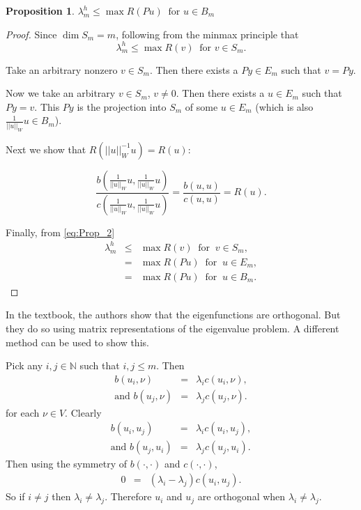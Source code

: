 \documentclass[../../main.tex]{subfiles}
\begin{document}
\newtheorem{Prop_2}[Prop_1]{Proposition}
\begin{Prop_2}
	\label{Prop_2}
	$\lambda^{h}_{m} \leq \max R(Pu) \ \text{ for } u \in B_{m}$
\end{Prop_2}
\begin{proof}
	Since $\dim S_{m} = m$, following from the minmax principle that
	\begin{equation}
		\lambda_m^h \leq \max R(v) \ \text{ for } v \in S_m. \label{eq:Prop_2}
	\end{equation}

	Take an arbitrary nonzero $v \in S_m$. Then there exists a $Py \in E_m$ such that $v = Py$.
 
	Now we take an arbitrary $v \in S_{m}$, $v \neq 0$. Then there exists a $u \in E_{m}$ such that $Py = v$. This $Py$ is the projection into $S_m$ of some $u \in E_m$ (which is also $\displaystyle \frac{1}{||u||_{W}}u \in B_m$).
	
	Next we show that $R(||u||_{W}^{-1}u) = R(u)$:

	\[ \frac{b\left(\frac{1}{||u||_{W}}u,\frac{1}{||u||_{W}}u\right)}{c\left(\frac{1}{||u||_{W}}u,\frac{1}{||u||_{W}}u\right)} = \frac{b(u,u)}{c(u,u)} = R(u). \]

	Finally, from \eqref{eq:Prop_2}
	\begin{eqnarray*}
	\lambda_{m}^{h} &\leq & \max R(v) \ \text{ for } \ v \in S_{m},\\
						&=& \max R(Pu) \ \text{ for } \ u \in E_{m},\\
						&=& \max R(Pu) \ \text{ for } \ u \in B_{m}.
	\end{eqnarray*}
\end{proof}

In the textbook, the authors show that the eigenfunctions are orthogonal. But they do so using matrix representations of the eigenvalue problem. A different method can be used to show this.

Pick any $i,j \in \mathbb{N}$ such that $i,j \leq m$. Then
\begin{eqnarray*}
	b(u_{i},\nu) &=& \lambda_{i}c(u_{i},\nu),\\
	\textrm{and } b(u_{j},\nu) &=& \lambda_{j}c(u_{j},\nu).
\end{eqnarray*}
for each $\nu \in V$. Clearly
\begin{eqnarray*}
	b(u_{i},u_{j}) &=& \lambda_{i}c(u_{i},u_{j}),\\
	\textrm{and } b(u_{j},u_{i}) &=& \lambda_{j}c(u_{j},u_{i}).
\end{eqnarray*}
Then using the symmetry of $b(\cdot,\cdot)$ and $c( \cdot, \cdot )$,
\begin{eqnarray*}
	0 &=& (\lambda_{i} - \lambda_{j}) c( u_{i}, u_{j} ).
\end{eqnarray*}
So if $i \neq j$ then $\lambda_{i} \neq \lambda_{j}$. Therefore $u_{i}$ and $u_{j}$ are orthogonal when $\lambda_i \neq \lambda_j$.
\end{document}
